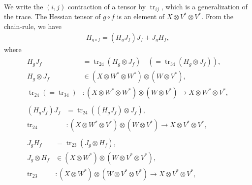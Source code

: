 \documentclass[a4paper]{article}
\newcommand{\jac}{J}
\newcommand{\hes}{H}
\newcommand{\parens}[1]{\left(#1\right)}
\newcommand{\tr}{\mathop{\mathrm{tr}}\nolimits}
\begin{document}
We write the $(i, j)$ contraction of a tensor by $\tr_{ij}$,
which is a generalization of the trace.
The Hessian tensor of $g\circ f$ is an element of
$X \otimes V^* \otimes V^*$.
From the chain-rule, we have
\begin{align}
    \hes_{g\circ f} =
    \parens{\hes_g \jac_f} \jac_f +
    \jac_g \hes_f,
\end{align}
where
\begin{align}
    \begin{aligned}
        \hes_g \jac_f & = \tr_{24}\parens{\hes_g \otimes \jac_f}
        \quad\parens{= \tr_{34}\parens{\hes_g \otimes \jac_f}},\\
        \hes_g \otimes \jac_f &\in (X \otimes W^* \otimes W^*) \otimes (W \otimes V^*),\\
        \tr_{24}\parens{= \tr_{34}} &: (X \otimes W^* \otimes W^*) \otimes (W \otimes V^*) \to
        X \otimes W^* \otimes V^*,
    \end{aligned}
    \\[15pt]
    \begin{aligned}
        \parens{\hes_g \jac_f} \jac_f &= \tr_{24}\parens{\parens{\hes_g \jac_f} \otimes \jac_f},\\
        \tr_{24} &: \parens{X \otimes W^* \otimes V^*} \otimes \parens{W \otimes V^*}
        \to X \otimes V^* \otimes V^*,
    \end{aligned}
    \\[15pt]
    \begin{aligned}
        \jac_g \hes_f &= \tr_{23}\parens{\jac_g \otimes \hes_f},\\
        \jac_g \otimes \hes_f &\in (X \otimes W^*) \otimes (W \otimes V^* \otimes V^*),\\
        \tr_{23} &: (X \otimes W^*) \otimes (W \otimes V^* \otimes V^*) \to
        X \otimes V^* \otimes V^*,
    \end{aligned}
\end{align}
\end{document}

